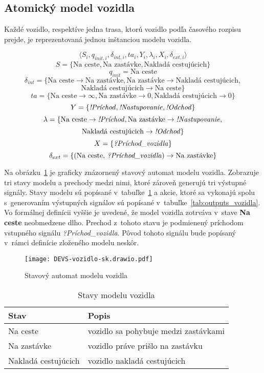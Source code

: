 \newpage
\subsection*{Atomický model vozidla}\label{model_vozidla}

Každé vozidlo, respektíve jedna trasa, ktorú vozidlo podľa časového rozpisu prejde, je reprezentovaná jednou inštanciou modelu vozidla.

\[\langle S_i, q_{init,i}, {\delta}_{int,i}, ta_i, Y_i, {\lambda}_i, X_i, {\delta}_{ext,i} \rangle\]
\[S = \{\text{Na ceste}, \text{Na zastávke}, \text{Nakladá cestujúcich} \}\]
\[q_{init} = \text{Na ceste}\]
\[\delta_{int} = \{ \text{Na ceste} \rightarrow \text{Na zastávke}, \text{Na zastávke} \rightarrow \text{Nakladá cestujúcich},\]
\[\text{Nakladá cestujúcich} \rightarrow \text{Na ceste} \}\]
\[ta = \{ \text{Na ceste} \rightarrow \infty, \text{Na zastávke} \rightarrow 0, \text{Nakladá cestujúcich} \rightarrow 0 \}\]
\[Y = \{\text{\textit{!Príchod}}, \text{\textit{!Nastupovanie}}, \text{\textit{!Odchod}} \}\]
\[\lambda = \{ \text{Na ceste} \rightarrow \text{\textit{!Príchod}}, \text{Na zastávke} \rightarrow \text{\textit{!Nastupovanie}},\]
\[\text{Nakladá cestujúcich} \rightarrow \text{\textit{!Odchod}} \}\]
\[X = \{ \text{\textit{?Príchod\_vozidla}} \}\]
\[\delta_{ext} = \{ (\text{Na ceste, \textit{?Príchod\_vozidla}}) \rightarrow \text{Na zastávke} \}\]

Na obrázku~\ref{fig:model_vozidla} je graficky znázornený stavový automat modelu vozidla.
Zobrazuje tri stavy modelu a prechody medzi nimi, ktoré zároveň generujú tri výstupné signály.
Stavy modelu sú popísané v~tabuľke~\ref{tab:stavy_vozidla} a akcie, ktoré sa vykonajú spolu s~generovaním výstupných signálov sú popísané v~tabuľke~\ref{tab:outputs_vozidla}.
Vo formálnej definícii vyššie je uvedené, že model vozidla zotrváva v~stave \textbf{Na ceste} neobmedzene dlho.
Prechod z~tohoto stavu je podmienený príchodom vstupného signálu \textit{?Príchod\_vozidla}.
Pôvod tohoto signálu bude popísaný v~rámci definície zloženého modelu neskôr.

\begin{figure}[h]\label{fig:model_vozidla}
  \centering
  \texttt{[image: DEVS-vozidlo-sk.drawio.pdf]}
  \caption{Stavový automat modelu vozidla}
\end{figure}

\begin{table}[h]\label{tab:stavy_vozidla}
  \centering
  \begin{tabularx}{\textwidth}{|l|X|}
    \hline
    \textbf{Stav} & \textbf{Popis} \\ \hline
    Na ceste & vozidlo sa pohybuje medzi zastávkami \\ \hline
    Na zastávke & vozidlo práve prišlo na zastávku \\ \hline
    Nakladá cestujúcich & vozidlo nakladá cestujúcich \\ \hline
  \end{tabularx}
  \caption{Stavy modelu vozidla}
\end{table}

